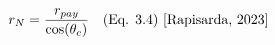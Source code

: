 \documentclass[preview]{standalone}
\begin{document}
\begin{align*}
\special{dvisvgm:raw <g id='unique000'>}r_N = \frac{r_{pay}}{\cos(\theta_c)} \quad \text{(Eq. 3.4) [Rapisarda, 2023]}\special{dvisvgm:raw </g>}
\end{align*}
\end{document}

